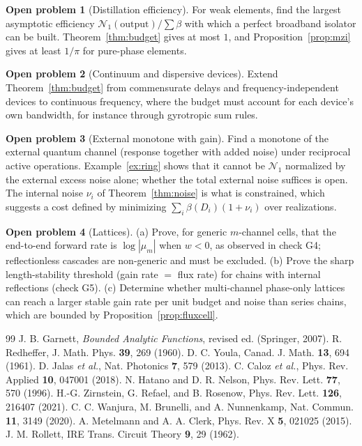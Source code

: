 \documentclass[11pt]{article}
\theoremstyle{definition}
\newtheorem{problem}{Open problem}
\theoremstyle{remark}
\newcommand{\NN}{\mathcal N_1}
\begin{document}
\begin{problem}[Distillation efficiency]
For weak elements, find the largest asymptotic efficiency $\NN(\text{output})/\sum\beta$ with which a perfect broadband isolator can be built. Theorem~\ref{thm:budget} gives at most $1$, and Proposition~\ref{prop:mzi} gives at least $1/\pi$ for pure-phase elements.
\end{problem}

\begin{problem}[Continuum and dispersive devices]
Extend Theorem~\ref{thm:budget} from commensurate delays and frequency-independent devices to continuous frequency, where the budget must account for each device's own bandwidth, for instance through gyrotropic sum rules.
\end{problem}

\begin{problem}[External monotone with gain]\label{op:gain}
Find a monotone of the external quantum channel (response together with added noise) under reciprocal active operations. Example~\ref{ex:ring} shows that it cannot be $\NN$ normalized by the external excess noise alone; whether the total external noise suffices is open. The internal noise $\nu_i$ of Theorem~\ref{thm:noise} is what is constrained, which suggests a cost defined by minimizing $\sum_i\beta(D_i)(1+\nu_i)$ over realizations.
\end{problem}

\begin{problem}[Lattices]
(a) Prove, for generic $m$-channel cells, that the end-to-end forward rate is $\log|\mu_m|$ when $w<0$, as observed in check G4; reflectionless cascades are non-generic and must be excluded. (b) Prove the sharp length-stability threshold (gain rate $=$ flux rate) for chains with internal reflections (check G5). (c) Determine whether multi-channel phase-only lattices can reach a larger stable gain rate per unit budget and noise than series chains, which are bounded by Proposition~\ref{prop:fluxcell}.
\end{problem}

\begin{thebibliography}{99}
 J. B. Garnett, \emph{Bounded Analytic Functions}, revised ed. (Springer, 2007).
 R. Redheffer, J. Math. Phys. \textbf{39}, 269 (1960).
 D. C. Youla, Canad. J. Math. \textbf{13}, 694 (1961).
 D. Jalas \emph{et al.}, Nat. Photonics \textbf{7}, 579 (2013).
 C. Caloz \emph{et al.}, Phys. Rev. Applied \textbf{10}, 047001 (2018).
 N. Hatano and D. R. Nelson, Phys. Rev. Lett. \textbf{77}, 570 (1996).
 H.-G. Zirnstein, G. Refael, and B. Rosenow, Phys. Rev. Lett. \textbf{126}, 216407 (2021).
 C. C. Wanjura, M. Brunelli, and A. Nunnenkamp, Nat. Commun. \textbf{11}, 3149 (2020).
 A. Metelmann and A. A. Clerk, Phys. Rev. X \textbf{5}, 021025 (2015).
 J. M. Rollett, IRE Trans. Circuit Theory \textbf{9}, 29 (1962).
\end{thebibliography}
\end{document}
